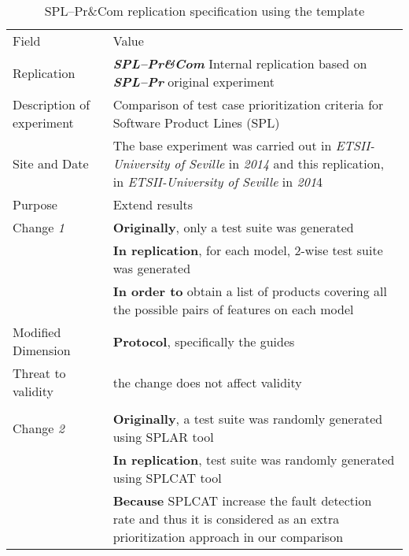 \begin{table*}[h]
  \caption{SPL--Pr\&Com replication specification using the template}
\label{tab:jap}
  \centering

\begin{tabularx}{\textwidth}{
  >{\hsize=0.25\hsize}X
  >{\hsize=0.8\hsize}X}
  
    \noalign{\smallskip}\hline\noalign{\smallskip}
  
  Field &  Value  \\ 
  \noalign{\smallskip}\hline\noalign{\smallskip}
 
 Replication &   \textbf{\emph{SPL--Pr\&Com}}   Internal replication based on \textbf{\emph{SPL--Pr}}  original experiment   \\

 Description \newline of experiment &  Comparison of test case prioritization criteria for Software Product Lines (SPL) \\  
 
 Site and Date & The  base  experiment  was  carried  out  in \textit{ETSII-University of Seville} in \textit{2014} and this replication, in \textit{ETSII-University of Seville} in \textit{201}4  \\
    Purpose  &  Extend results \\  
\hline   
   
   Change \textit{1}   & \textbf{Originally}, only a test suite was generated \\ & \textbf{In replication}, for each model, 2-wise test suite was generated \\& \textbf{In order to} obtain a list of products covering all the possible pairs of features on each model \\ 
     
    
    Modified Dimension & 
    \textbf{Protocol}, specifically the guides \\   
    Threat to validity  & the change does not affect validity \\
   
 \\ 
 \hline   
    Change \textit{2}   & \textbf{Originally}, a test suite was randomly generated using SPLAR tool \\ & \textbf{In replication}, test suite was randomly generated using SPLCAT  tool \\& \textbf{Because} SPLCAT increase the fault detection rate and thus it is considered as an extra prioritization approach in our comparison \\ 
    

\end{tabularx}
\end{table*}
